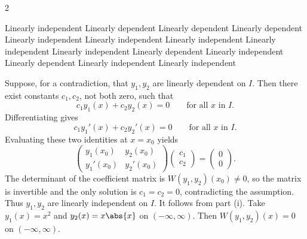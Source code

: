 \begin{multicols}{2}\scriptsize
	\begin{Answer}[ref={EX31}]
		\Question \label{3-1-1a}
		\begin{tasks}
			\task Linearly independent 
			\task Linearly dependent
			\task Linearly dependent 
			\task Linearly dependent 
			\task Linearly independent 
			\task Linearly independent 
			\task Linearly independent 
			\task Linearly independent 
			\task Linearly independent 
			\task Linearly dependent 
			\task Linearly independent 
			\task Linearly dependent
			\task Linearly independent 
			\task Linearly independent 
		\end{tasks} 
		
	\Question \label{3-1-2a}
	\begin{tasks}
		\task 	Suppose, for a contradiction, that $y_1,y_2$ are linearly dependent on $I$. Then there exist constants $c_1,c_2$, not both zero, such that
		\[
		c_1y_1(x)+c_2y_2(x)=0\qquad\text{for all \(x\) in \(I\)}.
		\]
		Differentiating gives
		\[
		c_1y_1'(x)+c_2y_2'(x)=0\qquad\text{for all \(x\) in \(I\)}.
		\]
		Evaluating these two identities at $x=x_0$ yields
		\[
		\begin{pmatrix}
			y_1(x_0) & y_2(x_0)\\[4pt]
			y_1'(x_0) & y_2'(x_0)
		\end{pmatrix}
		\begin{pmatrix} c_1\\ c_2\end{pmatrix}
		=\begin{pmatrix}0\\0\end{pmatrix}.
		\]
		The determinant of the coefficient matrix is $W(y_1,y_2)(x_0)\neq0$, so the matrix is invertible and the only solution is $c_1=c_2=0$, contradicting the assumption. Thus $y_1,y_2$ are linearly independent on $I$.
		\task It follows from part (i).
		\task Take $y_1(x) = x^2$ and $y_2(x) = x\abs{x}$ on \((-\infty, \infty).\) Then \(W(y_1, y_2)(x) = 0\) on \((-\infty, \infty).\)
	\end{tasks}	
	
	\end{Answer}
\end{multicols}




